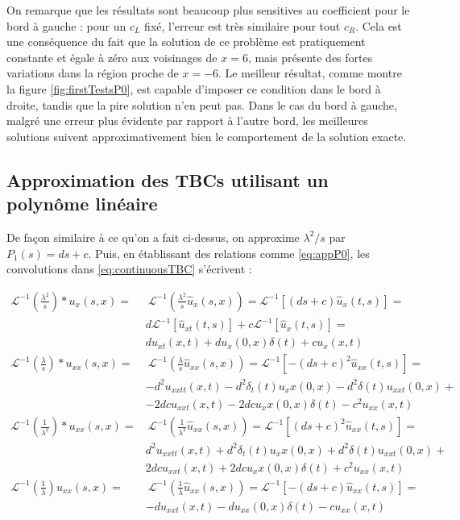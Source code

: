 \indent On remarque que les résultats sont beaucoup plus sensitives au coefficient pour le bord à gauche : pour un $c_L$ fixé, l'erreur est très similaire pour tout $c_R$. Cela est une conséquence du fait que la solution de ce problème est pratiquement constante et égale à zéro aux voisinages de $x = 6$, mais présente des fortes variations dans la région proche de  $x = -6$. Le meilleur résultat, comme montre la figure \ref{fig:firstTestsP0}, est capable d'imposer ce condition dans le bord à droite, tandis que la pire solution n'en peut pas. Dans le cas du bord à gauche, malgré une erreur plus évidente par rapport à l'autre bord, les meilleures solutions suivent approximativement bien le comportement de la solution exacte.

\subsection{Approximation des TBCs utilisant un polynôme linéaire}

\indent De façon similaire à ce qu'on a fait ci-dessus, on approxime $\lambda^2/s$ par $P_1(s) = ds + c$. Puis, en établissant des relations comme \eqref{eq:appP0}, les convolutions dans \eqref{eq:continuousTBC} s'écrivent :

\begin{equation*}
	\begin{aligned}
    \mathcal{L}^{-1} \left( \frac{\lambda^2}{s}\right) *  u_x(s,x)   =  & \  \mathcal{L}^{-1} \left( \frac{\lambda^2}{s} \hat{u}_x(s,x) \right) =  \mathcal{L}^{-1} \left[ (ds+c) \hat{u}_x(t,s) \right] = \\
    			 & d\mathcal{L}^{-1} \left[ \hat{u}_{xt}(t,s) \right] + c \mathcal{L}^{-1} \left[ \hat{u}_{x}(t,s) \right] = \\
    			 &   du_{xt}(x,t) + du_x(0,x)\delta (t) + cu_x(x,t) \\
    \mathcal{L}^{-1} \left( \frac{\lambda}{s} \right) * u_{xx}(s,x)  = & \   \mathcal{L}^{-1} \left( \frac{\lambda}{s} \hat{u}_{xx}(s,x) \right) =  \mathcal{L}^{-1} \left[ -(ds+c)^2 \hat{u}_{xx}(t,s) \right] =\\
    			&  -d^2u_{xxtt}(x,t) - d^2\delta_t(t) u_xx(0,x) - d^2 \delta(t)u_{xxt}(0,x)  + \\ 
    			& - 2dcu_{xxt}(x,t) -  2dcu_xx(0,x)\delta (t) - c^2u_{xx}(x,t) \\
     \mathcal{L}^{-1} \left( \frac{1}{\lambda^2} \right) * u_{xx}(s,x)  = & \  \mathcal{L}^{-1} \left( \frac{1}{\lambda^2} \hat{u}_{xx}(s,x) \right) = \mathcal{L}^{-1} \left[ (ds+c)^2 \hat{u}_{xx}(t,s) \right] = \\
    			& d^2u_{xxtt}(x,t) + d^2\delta_t(t) u_xx(0,x) + d^2 \delta(t)u_{xxt}(0,x)  + \\
    			& 2dcu_{xxt}(x,t) +  2dcu_xx(0,x)\delta (t) + c^2u_{xx}(x,t) \\
     \mathcal{L}^{-1} \left( \frac{1}{\lambda} \right) u_{xx}(s,x) = & \  \mathcal{L}^{-1} \left( \frac{1}{\lambda} \hat{u}_{xx}(s,x) \right) = \mathcal{L}^{-1} \left[ -(ds+c) \hat{u}_{xx}(t,s) \right] = \\
    			& -du_{xxt}(x,t) - du_{xx}(0,x)\delta (t) - cu_{xx}(x,t)
\end{aligned}
\end{equation*}

